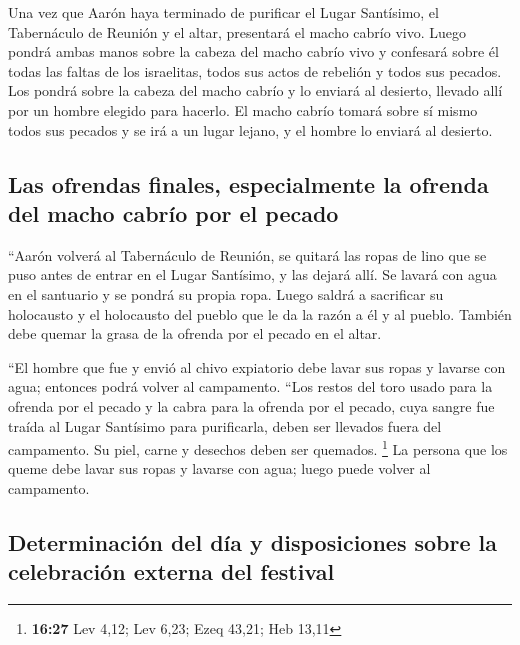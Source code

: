  Una vez que Aarón haya terminado de purificar el Lugar
Santísimo, el Tabernáculo de Reunión y el altar, presentará el macho
cabrío vivo.  Luego pondrá ambas manos sobre la cabeza
del macho cabrío vivo y confesará sobre él todas las faltas de los
israelitas, todos sus actos de rebelión y todos sus pecados. Los pondrá
sobre la cabeza del macho cabrío y lo enviará al desierto, llevado allí
por un hombre elegido para hacerlo.  El macho cabrío
tomará sobre sí mismo todos sus pecados y se irá a un lugar lejano, y el
hombre lo enviará al desierto.

\hypertarget{las-ofrendas-finales-especialmente-la-ofrenda-del-macho-cabruxedo-por-el-pecado}{%
\subsection{Las ofrendas finales, especialmente la ofrenda del macho
cabrío por el
pecado}\label{las-ofrendas-finales-especialmente-la-ofrenda-del-macho-cabruxedo-por-el-pecado}}

 ``Aarón volverá al Tabernáculo de Reunión, se quitará
las ropas de lino que se puso antes de entrar en el Lugar Santísimo, y
las dejará allí.  Se lavará con agua en el santuario y se
pondrá su propia ropa. Luego saldrá a sacrificar su holocausto y el
holocausto del pueblo que le da la razón a él y al pueblo.
 También debe quemar la grasa de la ofrenda por el pecado
en el altar.

 ``El hombre que fue y envió al chivo expiatorio debe
lavar sus ropas y lavarse con agua; entonces podrá volver al campamento.
 ``Los restos del toro usado para la ofrenda por el
pecado y la cabra para la ofrenda por el pecado, cuya sangre fue traída
al Lugar Santísimo para purificarla, deben ser llevados fuera del
campamento. Su piel, carne y desechos deben ser quemados. \footnote{\textbf{16:27}
  Lev 4,12; Lev 6,23; Ezeq 43,21; Heb 13,11}  La persona
que los queme debe lavar sus ropas y lavarse con agua; luego puede
volver al campamento.

\hypertarget{determinaciuxf3n-del-duxeda-y-disposiciones-sobre-la-celebraciuxf3n-externa-del-festival}{%
\subsection{Determinación del día y disposiciones sobre la celebración
externa del
festival}\label{determinaciuxf3n-del-duxeda-y-disposiciones-sobre-la-celebraciuxf3n-externa-del-festival}}

